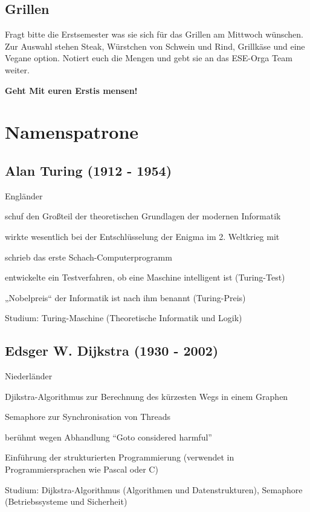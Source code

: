 \documentclass[a4paper,12pt]{report}
\begin{document}
\section{Grillen}

Fragt bitte die Erstsemester was sie sich für das Grillen am Mittwoch wünschen. Zur Auswahl stehen Steak, Würstchen von Schwein und Rind, Grillkäse und eine Vegane option. Notiert euch die Mengen und gebt sie an das ESE-Orga Team weiter.

\bigskip
\bigskip
\begin{center}
\huge{\textbf{Geht Mit euren Erstis mensen!}}
\end{center}
\chapter{Namenspatrone}
\section*{Alan Turing (1912 - 1954)}
\begin{itemize*}
    \item Engländer
    \item schuf den Großteil der theoretischen Grundlagen der modernen Informatik
    \item wirkte wesentlich bei der Entschlüsselung der Enigma im 2. Weltkrieg mit
    \item schrieb das erste Schach-Computerprogramm
    \item entwickelte ein Testverfahren, ob eine Maschine intelligent ist (Turing-Test)
    \item „Nobelpreis“ der Informatik ist nach ihm benannt (Turing-Preis)
    \item Studium: Turing-Maschine (Theoretische Informatik und Logik)
\end{itemize*}

\section*{Edsger W. Dijkstra (1930 - 2002)}
\begin{itemize*}
    \item Niederländer
    \item Djikstra-Algorithmus zur Berechnung des kürzesten Wegs in einem Graphen
    \item Semaphore zur Synchronisation von Threads
    \item berühmt wegen Abhandlung ``Goto considered harmful''
    \item Einführung der strukturierten Programmierung (verwendet in Programmiersprachen wie
          Pascal oder C)
    \item Studium: Dijkstra-Algorithmus (Algorithmen und Datenstrukturen), Semaphore
          (Betriebssysteme und Sicherheit)
\end{itemize*}
\end{document}
